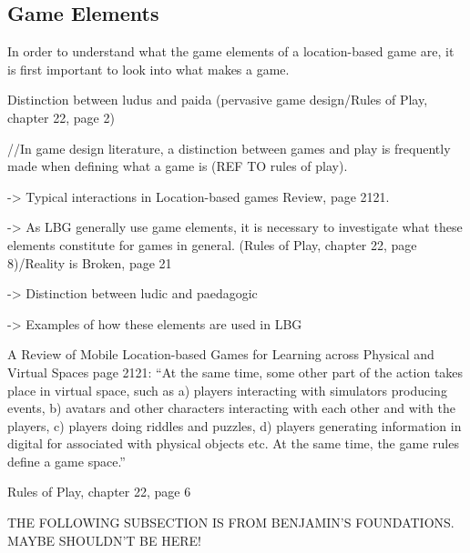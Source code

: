 \subsection{Game Elements}
In order to understand what the game elements of a location-based game are, it is first important to look into what makes a game. 

Distinction between ludus and paida (pervasive game design/Rules of Play, chapter 22, page 2)

//In game design literature, a distinction between games and play is frequently made when defining what a game is (REF TO rules of play). 

-> Typical interactions in Location-based games Review, page 2121.

-> As LBG generally use game elements, it is necessary to investigate what these elements constitute for games in general. (Rules of Play, chapter 22, page 8)/Reality is Broken, page 21

-> Distinction between ludic and paedagogic

-> Examples of how these elements are used in LBG

A Review of Mobile Location-based Games for Learning across Physical and Virtual Spaces page 2121:
“At the same time, some other part of the action takes place in virtual space, such as a) players interacting with simulators producing events, b) avatars and other characters interacting with each other and with the players, c) players doing riddles and puzzles, d) players generating information in digital for associated with physical objects etc. At the same time, the game rules define a game space.”

Rules of Play, chapter 22, page 6

THE FOLLOWING SUBSECTION IS FROM BENJAMIN'S FOUNDATIONS. MAYBE SHOULDN'T BE HERE!
